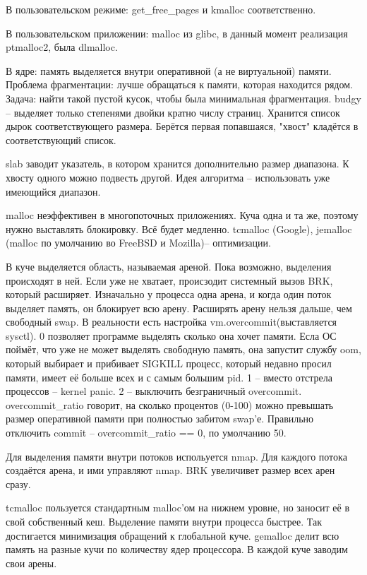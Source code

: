 \documentclass[a4paper,10pt]{article}
\begin{document}
В пользовательском режиме:
get_free_pages и kmalloc соответственно.

В пользовательском приложении: 
malloc из glibc, в данный момент реализация ptmalloc2, была dlmalloc.

В ядре:
память выделяется внутри оперативной (а не виртуальной) памяти. 
Проблема фрагментации: лучше обращаться к памяти, которая находится рядом.
Задача: найти такой пустой кусок, чтобы была минимальная фрагментация.
budgy -- выделяет только степенями двойки кратно числу страниц.
Хранится список дырок соответствующего размера. Берётся первая попавшаяся, "хвост" кладётся в соответствующий список.

slab заводит указатель, в котором хранится дополнительно размер диапазона. К хвосту одного можно подвесть другой.
Идея алгоритма -- использовать уже имеющийся диапазон.

malloc неэффективен в многопоточных приложениях. Куча одна и та же, поэтому нужно выставлять блокировку. Всё будет медленно.
tcmalloc (Google), jemalloc (malloc по умолчанию во FreeBSD и Mozilla)-- оптимизации.

В куче выделяется область, называемая ареной. Пока возможно, выделения происходят в ней. Если уже не хватает, происзодит системный вызов BRK, который расширяет.
Изначально у процесса одна арена, и когда один поток выделяет память, он блокирует всю арену. 
Расширять арену нельзя дальше, чем свободный swap. В реальности есть настройка vm.overcommit(выставляется sysctl).
0 позволяет программе выделять сколько она хочет памяти. Есла ОС поймёт, что уже не может выделять свободную память, она запустит службу oom, который выбирает и прибивает SIGKILL процесс, который недавно просил памяти, имеет её больше всех и с самым большим pid.
1 -- вместо отстрела процессов -- kernel panic.
2 -- выключить безграничный overcommit. overcommit\_ratio говорит, на сколько процентов (0-100) можно превышать размер оперативной памяти при полностью забитом swap'е.
Правильно отключить commit -- overcommit\_ratio == 0, по умолчанию 50.

Для выделения памяти внутри потоков испольуется nmap. Для каждого потока создаётся арена, и ими управляют nmap. BRK увеличивет размер всех арен сразу.


tcmalloc пользуется стандартным malloc'ом на нижнем уровне, но заносит её в свой собственный кеш. Выделение памяти внутри процесса быстрее. Так достигается минимизация обращений к глобальной куче.
gemalloc делит всю память на разные кучи по количеству ядер процессора. В каждой куче заводим свои арены.
\end{document}
